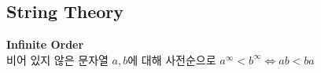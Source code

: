 \subsection{String Theory}

\vspace{5pt}
\noindent \textbf{Infinite Order} \\
비어 있지 않은 문자열 $a,b$에 대해 사전순으로
$a^\infty < b^\infty \iff ab < ba$

